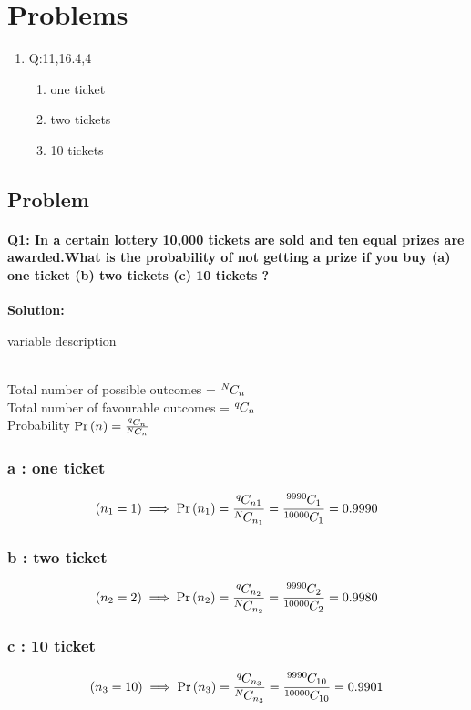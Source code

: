 \documentclass[10pt, a4paper]{article}
\title{\mytitle}
\author{\myauthor\hspace{1em}\\\contact\\FWC22088\hspace{6.5em}IITH\hspace{0.5em}\mymodule\hspace{6em}probability}
\providecommand{\brak}[1]{\ensuremath{\left(#1\right)}}
\providecommand{\pr}[1]{\ensuremath{\Pr\left(#1\right)}}
\newcommand*{\permcomb}[4][0mu]{{{}^{#3}\mkern#1#2_{#4}}}
\newcommand*{\comb}[1][-1mu]{\permcomb[#1]{C}}
\begin{document}
	\maketitle
\section{Problems}
\begin{enumerate}
\item Q:11,16.4,4
\begin{enumerate}
\item one ticket
\item two tickets
\item 10 tickets
\end{enumerate}
\end{enumerate}
\subsection{Problem}
\paragraph{Q1: In a certain lottery 10,000 tickets are sold and ten equal prizes are awarded.What is the probability of not getting a prize if you buy (a) one ticket (b) two tickets (c) 10 tickets ?\\}	

\textbf{Solution:}
\begin{table}[h]
	
	\caption{variable description}\label{Table1}
\end{table}
\\Total number of possible outcomes = $\comb{N}{n}$\\
Total number of favourable outcomes = $\comb{q}{n}$\\
Probability $\pr{n} = \frac{\comb{q}{n}}{\comb{N}{n}}$ \\
\subsubsection{a : one ticket}
\begin{align}
\brak{n_1 = 1} \implies
\pr{n_1}= \frac{\comb{q}{n1}}{\comb{N}{n_1}}
=\frac{\comb{9990}{1}}{\comb{10000}{1}} = 0.9990
\end{align}
\subsubsection{b : two ticket}
\begin{align}
\brak{n_2 = 2 }\implies  \pr{n_2} =  \frac{\comb{q}{n_2}}{\comb{N}{n_2}}=\frac{\comb{9990}{2}}{\comb{10000}{2}} = 0.9980
\end{align}
\subsubsection{c : 10 ticket}
\begin{align}
\brak{n_3 = 10} \implies  \pr{n_3} = \frac{\comb{q}{n_3}}{\comb{N}{n_3}}=\frac{\comb{9990}{10}}{\comb{10000}{10}} = 0.9901
\end{align}
\end{document}
